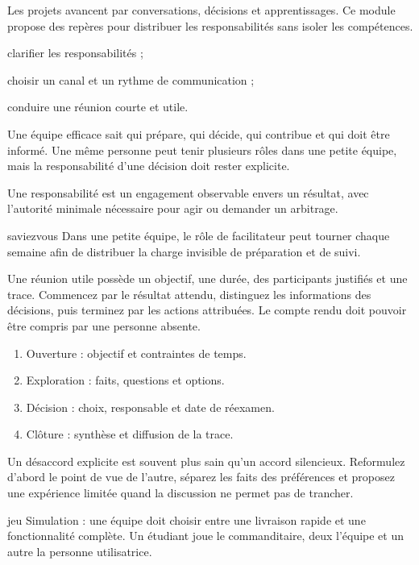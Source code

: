 \documentclass[12pt,twoside]{upbcours}
\begin{document}
\introduction
\begin{survol}
  Les projets avancent par conversations, décisions et apprentissages. Ce module propose des
  repères pour distribuer les responsabilités sans isoler les compétences.
\end{survol}
\begin{objectifs}
  \item clarifier les responsabilités ;
  \item choisir un canal et un rythme de communication ;
  \item conduire une réunion courte et utile.
\end{objectifs}
Une équipe efficace sait qui prépare, qui décide, qui contribue et qui doit être informé. Une même
personne peut tenir plusieurs rôles dans une petite équipe, mais la responsabilité d'une décision
doit rester explicite.
\begin{definition}[Responsabilité]
  Une responsabilité est un engagement observable envers un résultat, avec l'autorité minimale
  nécessaire pour agir ou demander un arbitrage.
\end{definition}
\begin{icone}{saviezvous}
  Dans une petite équipe, le rôle de facilitateur peut tourner chaque semaine afin de distribuer
  la charge invisible de préparation et de suivi.
\end{icone}
Une réunion utile possède un objectif, une durée, des participants justifiés et une trace. Commencez
par le résultat attendu, distinguez les informations des décisions, puis terminez par les actions
attribuées. Le compte rendu doit pouvoir être compris par une personne absente.
\begin{enumerate}
  \item Ouverture : objectif et contraintes de temps.
  \item Exploration : faits, questions et options.
  \item Décision : choix, responsable et date de réexamen.
  \item Clôture : synthèse et diffusion de la trace.
\end{enumerate}
Un désaccord explicite est souvent plus sain qu'un accord silencieux. Reformulez d'abord le point
de vue de l'autre, séparez les faits des préférences et proposez une expérience limitée quand la
discussion ne permet pas de trancher.
\begin{icone}{jeu}
  Simulation : une équipe doit choisir entre une livraison rapide et une fonctionnalité complète.
  Un étudiant joue le commanditaire, deux l'équipe et un autre la personne utilisatrice.
\end{icone}
\end{document}
